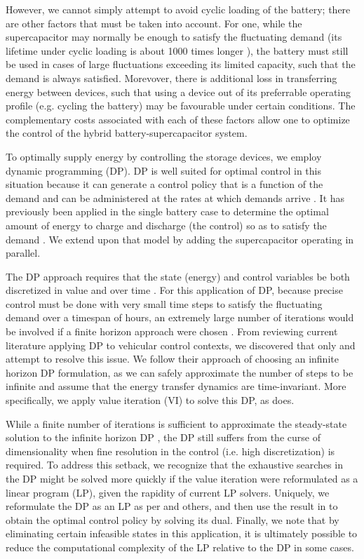 \documentclass[conference]{IEEEtran}
\begin{document}
However, we cannot simply attempt to avoid cyclic loading of the battery; there are other factors that must be taken into account. For one, while the supercapacitor may normally be enough to satisfy the fluctuating demand (its lifetime under cyclic loading is about 1000 times longer \cite{thounthong2009energy}), the battery must still be used in cases of large fluctuations exceeding its limited capacity, such that the demand is always satisfied. Morevover, there is additional loss in transferring energy between devices, such that using a device out of its preferrable operating profile (e.g. cycling the battery) may be favourable under certain conditions. The complementary costs associated with each of these factors allow one to optimize the control of the hybrid battery-supercapacitor system. 

To optimally supply energy by controlling the storage devices, we employ  dynamic programming (DP). DP is well suited for optimal control in this situation because it can generate a control policy that is a function of the demand and can be administered at the rates at which demands arrive \cite{6183284}. It has previously been applied in the single battery case to determine the optimal amount of energy to charge and discharge (the control) so as to satisfy the demand \cite{su2013modeling}. We extend upon that model by adding the supercapacitor operating in parallel.

The DP approach requires that the state (energy) and control variables be both discretized in value and over time \cite{8330176}\cite{6254368}. For this application of DP, because precise control must be done with very small time steps to satisfy the fluctuating demand over a timespan of hours, an extremely large number of iterations would be involved if a finite horizon approach were chosen \cite{6183284}. From reviewing current literature applying DP to vehicular control contexts, we discovered that only \cite{8330176} and \cite{8315074} attempt to resolve this issue. We follow their approach of choosing an infinite horizon DP formulation, as we can safely approximate the number of steps to be infinite and assume that the energy transfer dynamics are time-invariant. More specifically, we apply value iteration (VI) to solve this DP, as \cite{8315074} does.

While a finite number of iterations is sufficient to approximate the steady-state solution to the infinite horizon DP \cite{Bertsekas:2007:DPO:1396348}, the DP still suffers from the curse of dimensionality when fine resolution in the control (i.e. high discretization) is required. To address this setback, we recognize that the exhaustive searches in the DP might be solved more quickly if the value iteration were reformulated as a linear program (LP), given the rapidity of current LP solvers. Uniquely, we reformulate the DP as an LP as per \cite{Bertsekas:2007:DPO:1396348} and others, and then use the result in \cite{4220813} to obtain the optimal control policy by solving its dual. Finally, we note that by eliminating certain infeasible states in this application, it is ultimately possible to reduce the computational complexity of the LP relative to the DP in some cases.
\end{document}
